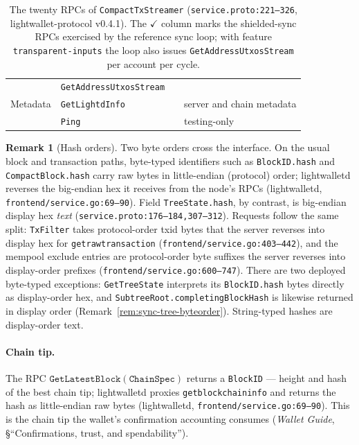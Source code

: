 \documentclass[11pt,a4paper]{article}
\theoremstyle{definition}
\newtheorem{remark}[theorem]{Remark}
\begin{document}
\begin{table}[htbp]
\begin{tabular}{@{}llcl@{}}
 & \texttt{GetAddressUtxosStream} & & \\
\addlinespace
Metadata & \texttt{GetLightdInfo} & & server and chain metadata \\
 & \texttt{Ping} & & testing-only \\
\bottomrule
\end{tabular}
\caption{The twenty RPCs of \texttt{CompactTxStreamer}
(\texttt{service.proto:221--326}, lightwallet-protocol v0.4.1). The
$\checkmark$ column marks the shielded-sync RPCs exercised by the
reference sync loop; with feature \texttt{transparent-inputs} the loop
also issues \texttt{GetAddressUtxosStream} per account per cycle.}
\label{tab:sync-rpcs}
\end{table}

\begin{remark}[Hash orders]\label{rem:sync-endian}
Two byte orders cross the interface. On the usual block and transaction
paths, byte-typed identifiers such as \texttt{BlockID.hash} and
\texttt{CompactBlock.hash} carry raw bytes in little-endian (protocol)
order; lightwalletd reverses the
big-endian hex it receives from the node's RPCs
(\textsf{lightwalletd}, \texttt{frontend/service.go:69--90}). Field
\texttt{TreeState.hash}, by contrast, is big-endian display hex
\emph{text} (\texttt{service.proto:176--184,307--312}). Requests follow
the same split: \texttt{TxFilter} takes protocol-order txid bytes that
the server reverses into display hex for \texttt{getrawtransaction}
(\texttt{frontend/service.go:403--442}), and the mempool exclude entries
are protocol-order byte suffixes the server reverses into display-order
prefixes (\texttt{frontend/service.go:600--747}). There are two deployed
byte-typed exceptions: \texttt{GetTreeState} interprets its
\texttt{BlockID.hash} bytes directly as display-order hex, and
\texttt{SubtreeRoot.completingBlockHash} is likewise returned in display
order (Remark~\ref{rem:sync-tree-byteorder}). String-typed hashes are
display-order text.
\end{remark}

\paragraph{Chain tip.} The RPC
$\mathtt{GetLatestBlock}(\mathtt{ChainSpec})$ returns a \texttt{BlockID}
--- height and hash of the best chain tip; lightwalletd proxies
\texttt{getblockchaininfo} and returns the hash as little-endian raw bytes
(\textsf{lightwalletd}, \texttt{frontend/service.go:69--90}). This is the
chain tip the wallet's confirmation accounting consumes (\emph{Wallet
Guide}, \S``Confirmations, trust, and spendability'').
\end{document}
